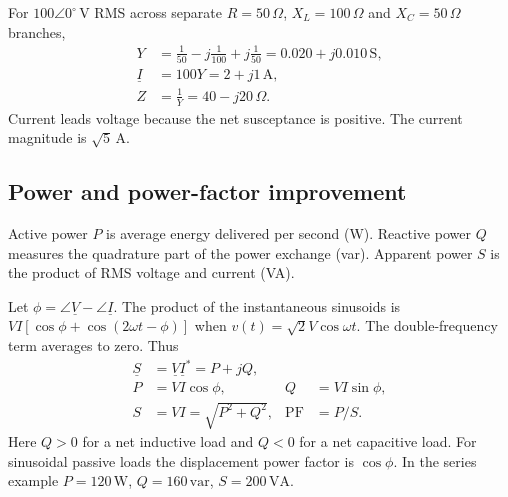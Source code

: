 \documentclass[12pt,a4paper]{article}
\begin{document}
\begin{tcolorbox}[examplebox,title={Find the input of a parallel RLC circuit}]
For \(100\angle0^\circ\,\mathrm V\) RMS across separate \(R=50\,\Omega\), \(X_L=100\,\Omega\) and \(X_C=50\,\Omega\) branches,
\[
\begin{aligned}
Y&=\frac{1}{50}-j\frac{1}{100}+j\frac{1}{50}
  =0.020+j0.010\,\mathrm S,\\
\underline I&=100Y=2+j1\,\mathrm A,\\
Z&=\frac{1}{Y}=40-j20\,\Omega.
\end{aligned}
\]
Current leads voltage because the net susceptance is positive. The current magnitude is \(\sqrt5\,\mathrm A\).
\end{tcolorbox}

\subsection{Power and power-factor improvement}
\begin{tcolorbox}[defbox,title={Active, reactive and apparent power}]
Active power \(P\) is average energy delivered per second (W). Reactive power \(Q\) measures the quadrature part of the power exchange (var). Apparent power \(S\) is the product of RMS voltage and current (VA).
\end{tcolorbox}

Let \(\phi=\angle\underline V-\angle\underline I\). The product of the instantaneous sinusoids is \(VI[\cos\phi+\cos(2\omega t-\phi)]\) when \(v(t)=\sqrt2V\cos\omega t\). The double-frequency term averages to zero. Thus
\[
\begin{aligned}
\underline S&=\underline V\underline I^*=P+jQ,\\
P&=VI\cos\phi,& Q&=VI\sin\phi,\\
S&=VI=\sqrt{P^2+Q^2},& \mathrm{PF}&=P/S.
\end{aligned}
\]
Here \(Q>0\) for a net inductive load and \(Q<0\) for a net capacitive load. For sinusoidal passive loads the displacement power factor is \(\cos\phi\). In the series example \(P=120\,\mathrm W\), \(Q=160\,\mathrm{var}\), \(S=200\,\mathrm{VA}\).
\end{document}
